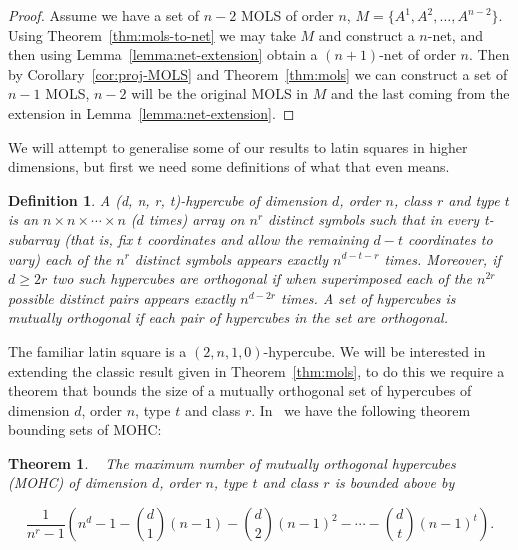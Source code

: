 \documentclass{article}
\newtheorem{theorem}{Theorem}
\newtheorem{definition}{Definition}
\begin{document}
\begin{proof}
  Assume we have a set of \(n - 2\) MOLS of order \(n\), \(M = \{A^{1}, A^{2}, \ldots, A^{n - 2}\}\). Using Theorem~\ref{thm:mols-to-net} we may take \(M\) and construct a \(n\)-net, and then using Lemma~\ref{lemma:net-extension} obtain a \((n + 1)\)-net of order \(n\). Then by Corollary~\ref{cor:proj-MOLS} and Theorem~\ref{thm:mols} we can construct a set of \(n - 1\) MOLS, \(n - 2\) will be the original MOLS in \(M\) and the last coming from the extension in Lemma~\ref{lemma:net-extension}.
\end{proof}


We will attempt to generalise some of our results to latin squares in higher dimensions, but first we need some definitions of what that even means.
\begin{definition}\label{def:hypercube}
  A (d, n, r, t)-hypercube of dimension \(d\), order \(n\), class \(r\) and type \(t\) is an \(n \times n \times \cdots \times n\) (\(d\) times) array on \(n^r\) distinct symbols such that in every t-subarray (that is, fix \(t\) coordinates and allow the remaining \(d - t\) coordinates to vary) each of the \(n^r\)
  distinct symbols appears exactly \(n^{d - t - r}\) times.
  Moreover, if \(d \geq 2r\) two such hypercubes are \textit{orthogonal} if when superimposed each of the \(n^{2r}\) possible distinct pairs appears exactly \(n^{d - 2r}\) times. A set of hypercubes is mutually orthogonal if each pair of hypercubes in the set are orthogonal.
\end{definition}

The familiar latin square is a \((2, n, 1, 0)\)-hypercube. We will be interested in extending the classic result given in Theorem~\ref{thm:mols}, to do this we require a
theorem that bounds the size of a mutually orthogonal set of hypercubes of dimension \(d\), order \(n\), type \(t\) and class \(r\). In~\cite{ETHIER2012430} we have the following theorem bounding sets of MOHC:

\begin{theorem}~\label{thm:mut-ortho}\cite[Theorem 2.4]{ETHIER2012430}
  The maximum number of mutually orthogonal hypercubes (MOHC) of dimension \(d\), order \(n\), type \(t\) and class \(r\) is bounded above by

  \begin{equation}
    \frac{1}{n^r - 1}\left(n^d - 1 - \binom{d}{1}(n - 1) - \binom{d}{2}{(n - 1)}^2 - \cdots - \binom{d}{t} {(n - 1)}^t\right). \label{eq:ortho-bound}
  \end{equation}

\end{theorem}
\end{document}
